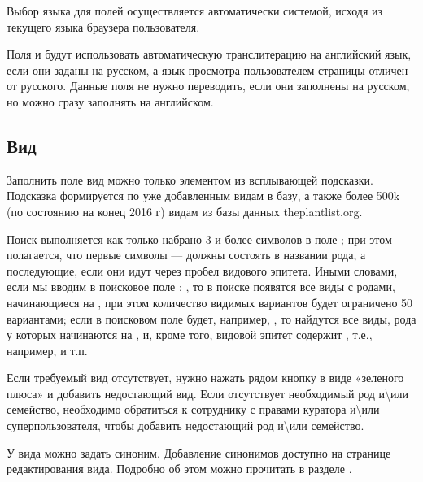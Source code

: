 \documentclass[letterpaper,10pt,russian]{sphinxmanual}
\begin{document}
Выбор языка для полей \textendash{}   осуществляется автоматически системой,
исходя из текущего языка браузера пользователя.

Поля  и  будут использовать автоматическую
транслитерацию на английский язык, если они заданы на русском, а язык
просмотра пользователем страницы отличен от русского. Данные поля не нужно переводить,
если они заполнены на русском, но можно сразу заполнять на английском.

\ignorespaces 

\subsection{Вид}
\label{\detokenize{main:id15}}\label{\detokenize{main:index-10}}
Заполнить поле вид можно только элементом из всплывающей подсказки. Подсказка формируется по уже добавленным
видам в базу, а также более 500k (по состоянию на конец 2016 г) видам из базы данных theplantlist.org.

Поиск выполняется как только набрано 3 и более символов в поле ; при этом полагается,
что первые символы — должны состоять в названии рода, а последующие,
если они идут через пробел \textendash{} видового эпитета.
Иными словами, если мы вводим в поисковое поле : , то в
поиске появятся все виды с родами, начинающиеся на ,
при этом количество видимых вариантов будет
ограничено 50 вариантами; если в
поисковом поле  будет, например, , то
найдутся все виды,  рода у которых начинаются  на , и,
кроме того, видовой эпитет содержит , т.е., например,  и т.п.

Если требуемый вид отсутствует, нужно нажать рядом кнопку в виде «зеленого плюса»
и добавить недостающий вид. Если отсутствует
необходимый род и\textbackslash{}или семейство, необходимо обратиться к
сотруднику с правами куратора и\textbackslash{}или суперпользователя,
чтобы добавить недостающий род и\textbackslash{}или семейство.

У вида можно задать синоним. Добавление синонимов доступно на странице редактирования вида.
Подробно об этом можно прочитать в разделе {\hyperref[\detokenize{main:id43}]{}}.
\end{document}
